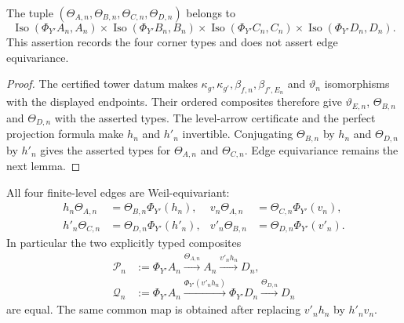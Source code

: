 \begin{lemma}
\label{lemma:weil-sf-well-defined-def-weil-pbc-frobenius-corner-structures}
The tuple $(\Theta_{A,n},\Theta_{B,n},\Theta_{C,n},\Theta_{D,n})$ belongs to
\[
 \operatorname{Iso}(\Phi_{Y'}A_n,A_n)\times
 \operatorname{Iso}(\Phi_{Y'}B_n,B_n)\times
 \operatorname{Iso}(\Phi_{Y'}C_n,C_n)\times
 \operatorname{Iso}(\Phi_{Y'}D_n,D_n).
\]
This assertion records the four corner types and does not assert edge
equivariance.
\end{lemma}
\begin{proof}
The certified tower datum makes $\kappa_g,\kappa_{g'},\beta_{f,n},
\beta_{f',E_n}$ and $\vartheta_n$ isomorphisms with the displayed
endpoints.  Their ordered composites therefore give
$\vartheta_{E,n}$, $\Theta_{B,n}$ and $\Theta_{D,n}$ with the asserted
types.  The level-arrow certificate and the perfect projection formula make
$h_n$ and $h'_n$ invertible.  Conjugating $\Theta_{B,n}$ by $h_n$ and
$\Theta_{D,n}$ by $h'_n$ gives the asserted types for $\Theta_{A,n}$ and
$\Theta_{C,n}$.  Edge equivariance remains the next lemma.
\end{proof}
\begin{lemma}
\label{lemma:weil-pbc-frobenius-level-rectangle}
All four finite-level edges are Weil-equivariant:
\[
\begin{aligned}
 h_n\Theta_{A,n}&=\Theta_{B,n}\Phi_{Y'}(h_n),&
 v_n\Theta_{A,n}&=\Theta_{C,n}\Phi_{Y'}(v_n),\\
 h'_n\Theta_{C,n}&=\Theta_{D,n}\Phi_{Y'}(h'_n),&
 v'_n\Theta_{B,n}&=\Theta_{D,n}\Phi_{Y'}(v'_n).
\end{aligned}
\]
In particular the two explicitly typed composites
\[
\begin{aligned}
 \mathcal P_n&:=
 \Phi_{Y'}A_n\xrightarrow{\Theta_{A,n}}A_n
 \xrightarrow{v'_nh_n}D_n,\\
 \mathcal Q_n&:=
 \Phi_{Y'}A_n\xrightarrow{\Phi_{Y'}(v'_nh_n)}\Phi_{Y'}D_n
 \xrightarrow{\Theta_{D,n}}D_n
\end{aligned}
\]
are equal.  The same common map is obtained after replacing $v'_nh_n$ by
$h'_nv_n$.
\end{lemma}
